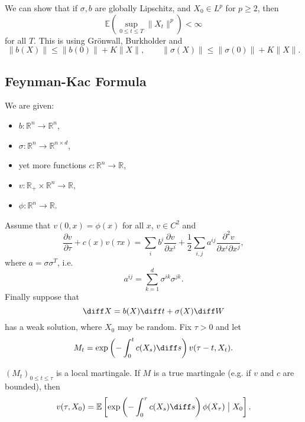 \documentclass[12pt]{article}
\begin{document}
We can show that if $\sigma, b$ are globally Lipschitz, and $X_0 \in L^{p}$ for $p \geq 2$, then
\[
\mathbb{E} \left( \sup_{0 \leq t \leq T} \|X_t\|^{p} \right) < \infty
\]
for all $T$. This is using Gr\"onwall, Burkholder and
\[
\|b(X)\| \leq \|b(0)\| + K \|X\|, \qquad \|\sigma(X)\| \leq \|\sigma(0)\| + K \|X\|.
\]

\subsection{Feynman-Kac Formula}%
\label{sub:fk}

We are given:
\begin{itemize}
	\item $b : \mathbb{R}^{n} \to \mathbb{R}^{n}$,
	\item $\sigma : \mathbb{R} ^{n} \to \mathbb{R}^{n \times d}$,
	\item yet more functions $c : \mathbb{R}^{n} \to \mathbb{R}$,
	\item $v : \mathbb{R}_+ \times \mathbb{R}^{n} \to \mathbb{R}$, 
	\item $\phi : \mathbb{R}^{n} \to \mathbb{R}$.
\end{itemize}
Assume that $v(0, x) = \phi(x)$ for all $x$, $v \in C^2$ and
\[
\frac{\partial v}{\partial \tau} + c(x) v(\tau x) = \sum_i b^i \frac{\partial v}{\partial x^{i}} + \frac 12 \sum_{i, j} a^{ij} \frac{\partial^2 v}{\partial x^i \partial x^j},
\]
where $a = \sigma \sigma^{T}$, i.e.
\[
a^{ij} = \sum_{k = 1}^{d} \sigma^{ik} \sigma^{jk}.
\]
Finally suppose that
\[
\diff X = b(X) \diff t + \sigma(X) \diff W
\]
has a weak solution, where $X_0$ may be random. Fix $\tau > 0$ and let
\[
M_t = \exp \left( - \int_0^{t} c(X_s) \diff s \right) v(\tau - t, X_t).
\]
\begin{theorem}
	$(M_t)_{0 \leq t \leq \tau}$ is a local martingale. If $M$ is a true martingale (e.g. if $v$ and $c$ are bounded), then
	\[
		v(\tau, X_0) = \mathbb{E} \left[ \exp \left( - \int_0^{\tau} c(X_s) \diff s \right) \phi(X_\tau) \bigm| X_0 \right].
	\]
\end{theorem}
 
\end{document}
